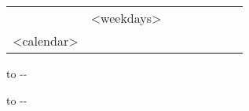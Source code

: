 \begin{tabularx}{\textwidth}{@{}l!{\vrule width 1pt}*{7}{@{}X@{}|}}
& <weekdays> \\ 
<calendar>
\end{tabularx}
\medskip

\parbox{\myLenTwoCol}{
    \vbox to \dimexpr\textheight-\pagetotal-\myHBL{}%
}
\hspace{.5em}
\parbox{\dimexpr.5\linewidth-.5em}{
    \vbox to \dimexpr\textheight-\pagetotal-\myHBL{}%
}